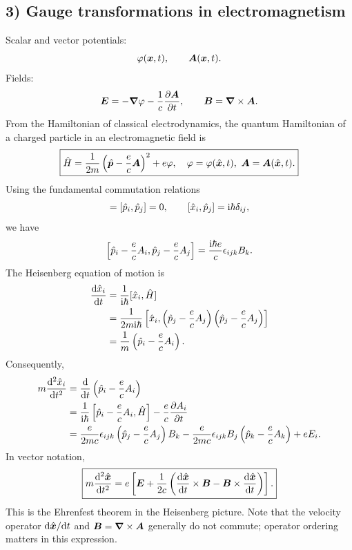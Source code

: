 \subsection*{3) Gauge transformations in electromagnetism}
Scalar and vector potentials:
\begin{equation}
\varphi(\bm{x},t),\qquad\bm{A}(\bm{x},t).
\end{equation}
Fields:
\begin{equation}
\bm{E}=-\bm{\nabla}\varphi-\frac1c\frac{\partial\bm{A}}{\partial t},\qquad
\bm{B}=\bm{\nabla}\times\bm{A}.
\end{equation}
From the Hamiltonian of classical electrodynamics, the quantum Hamiltonian of a charged particle in an electromagnetic field is
\begin{equation}
\boxed{\hat{H}=\frac1{2m}\left(\hat{\bm{p}}-\frac ec\bm{A}\right)^2+e\varphi,\quad
\varphi=\varphi(\hat{\bm{x}},t),\ \bm{A}=\bm{A}(\hat{\bm{x}},t).}
\end{equation}
Using the fundamental commutation relations
\begin{equation}
[\op x_i,\op x_j]=[\op p_i,\op p_j]=0,\qquad
[\op x_i,\op p_j]=\ii\hbar\delta_{ij},
\end{equation}
we have
\begin{equation}
\left[\hat{p}_i-\frac ec A_i,\hat{p}_j-\frac ec A_j\right]
=\frac{\mathrm{i}\hbar e}{c}\epsilon_{ijk}B_k.
\end{equation}
The Heisenberg equation of motion is
\begin{equation}
\begin{split}
\frac{\mathrm{d}\hat{x}_i}{\mathrm{d} t}
&=\frac1{\mathrm{i}\hbar}[\hat{x}_i,\hat{H}]\\
&=\frac1{2m\mathrm{i}\hbar}
\left[\hat{x}_i,\left(\hat{p}_j-\frac ecA_j\right)
\left(\hat{p}_j-\frac ecA_j\right)\right]\\
&=\frac1m\left(\hat{p}_i-\frac ecA_i\right).
\end{split}
\end{equation}
Consequently,
\begin{equation}
\begin{split}
m\frac{\mathrm{d}^2\hat{x}_i}{\mathrm{d} t^2}
&=\frac{\mathrm{d}}{\mathrm{d} t}\left(\hat{p}_i-\frac ecA_i\right)\\
&=\frac1{\mathrm{i}\hbar}\left[\hat{p}_i-\frac ecA_i,\hat{H}\right]
-\frac ec\frac{\partial A_i}{\partial t}\\
&=\frac{e}{2mc}\epsilon_{ijk}
\left(\hat{p}_j-\frac ecA_j\right)B_k
-\frac{e}{2mc}\epsilon_{ijk}B_j\left(\hat{p}_k-\frac ecA_k\right)
+eE_i.
\end{split}
\end{equation}
In vector notation,
\begin{equation}
\boxed{m\frac{\mathrm{d}^2\hat{\bm{x}}}{\mathrm{d} t^2}
=e\left[\bm{E}+\frac1{2c}
\left(\frac{\mathrm{d}\hat{\bm{x}}}{\mathrm{d} t}\times\bm{B}
-\bm{B}\times\frac{\mathrm{d}\hat{\bm{x}}}{\mathrm{d} t}\right)\right].}
\end{equation}
This is the Ehrenfest theorem in the Heisenberg picture. Note that the velocity operator $\mathrm{d}\hat{\bm{x}}/\mathrm{d} t$ and $\bm{B}=\bm{\nabla}\times\bm{A}$ generally do not commute; operator ordering matters in this expression.

